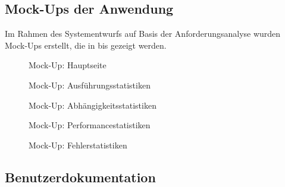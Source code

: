\subsection{Mock-Ups der Anwendung}
\label{app:Mockup}
Im Rahmen des Systementwurfs auf Basis der Anforderungsanalyse wurden Mock-Ups erstellt, die in  bis  gezeigt werden.
\begin{figure}[htb]
    \centering
    \caption{Mock-Up: Hauptseite}
    \label{fig:Hauptseite}
\end{figure}
\begin{figure}[htb]
    \centering
    \caption{Mock-Up: Ausführungsstatistiken}
\end{figure}
\begin{figure}[htb]
    \centering
    \caption{Mock-Up: Abhängigkeitsstatistiken}
\end{figure}
\begin{figure}[htb]
    \centering
    \caption{Mock-Up: Performancestatistiken}
\end{figure}
\begin{figure}[htb]
    \centering
    \caption{Mock-Up: Fehlerstatistiken}
    \label{fig:Fehlerstatistiken}
\end{figure}

\subsection{Benutzerdokumentation}
\label{app:Benutzerdokumentation}